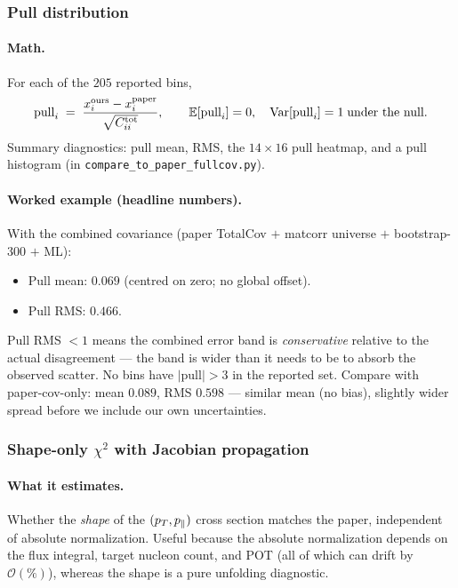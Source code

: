 \subsubsection{Pull distribution}
\label{sec:pull}

\paragraph{Math.}
For each of the $205$ reported bins,
\begin{equation}
\mathrm{pull}_{i}
\;=\;
\frac{x^{\text{ours}}_{i} - x^{\text{paper}}_{i}}{\sqrt{C^{\text{tot}}_{ii}}},
\qquad
\mathbb{E}[\mathrm{pull}_{i}] = 0,\quad
\mathrm{Var}[\mathrm{pull}_{i}] = 1
\;\text{under the null}.
\end{equation}
Summary diagnostics: pull mean, RMS, the $14\times16$ pull heatmap,
and a pull histogram (in \texttt{compare\_to\_paper\_fullcov.py}).

\paragraph{Worked example (headline numbers).}
With the combined covariance (paper TotalCov $+$ matcorr universe $+$
bootstrap-300 $+$ ML):
\begin{itemize}[nosep]
  \item Pull mean: $\boxed{0.069}$ (centred on zero; no global offset).
  \item Pull RMS: $\boxed{0.466}$.
\end{itemize}
Pull RMS $< 1$ means the combined error band is \emph{conservative}
relative to the actual disagreement --- the band is wider than it
needs to be to absorb the observed scatter. No bins have
$|\mathrm{pull}|>3$ in the reported set. Compare with paper-cov-only:
mean $0.089$, RMS $0.598$ --- similar mean (no bias), slightly wider
spread before we include our own uncertainties.

\subsubsection{Shape-only $\chi^{2}$ with Jacobian propagation}
\label{sec:shape}

\paragraph{What it estimates.}
Whether the \emph{shape} of the $(p_{T},p_{\parallel})$ cross section matches
the paper, independent of absolute normalization. Useful because the
absolute normalization depends on the flux integral, target nucleon
count, and POT (all of which can drift by $\mathcal{O}(\%)$), whereas
the shape is a pure unfolding diagnostic.

